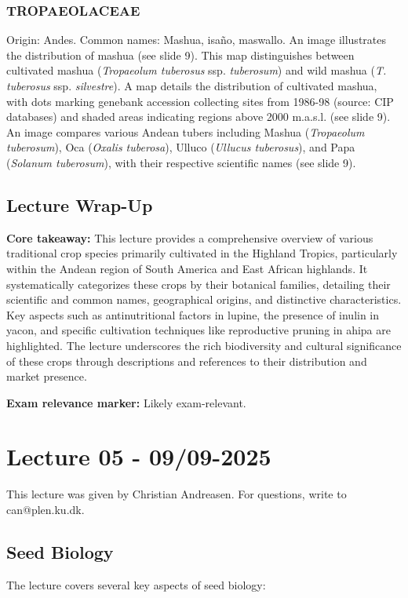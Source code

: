 \subsubsection*{TROPAEOLACEAE} 
Origin: Andes. Common names: Mashua, isaño, maswallo. An image illustrates the distribution of mashua (see slide 9). This map distinguishes between cultivated mashua (\textit{Tropaeolum tuberosus} ssp. \textit{tuberosum}) and wild mashua (\textit{T. tuberosus} ssp. \textit{silvestre}). A map details the distribution of cultivated mashua, with dots marking genebank accession collecting sites from 1986-98 (source: CIP databases) and shaded areas indicating regions above 2000 m.a.s.l. (see slide 9). An image compares various Andean tubers including Mashua (\textit{Tropaeolum tuberosum}), Oca (\textit{Oxalis tuberosa}), Ulluco (\textit{Ullucus tuberosus}), and Papa (\textit{Solanum tuberosum}), with their respective scientific names (see slide 9).


\subsection*{Lecture Wrap-Up} \textbf{Core takeaway:} 
This lecture provides a comprehensive overview of various traditional crop species primarily cultivated in the Highland Tropics, particularly within the Andean region of South America and East African highlands. It systematically categorizes these crops by their botanical families, detailing their scientific and common names, geographical origins, and distinctive characteristics. Key aspects such as antinutritional factors in lupine, the presence of inulin in yacon, and specific cultivation techniques like reproductive pruning in ahipa are highlighted. The lecture underscores the rich biodiversity and cultural significance of these crops through descriptions and references to their distribution and market presence. 

\vspace{1em} \textbf{Exam relevance marker:} Likely exam-relevant.

\section{Lecture 05 - 09/09-2025}
This lecture was given by Christian Andreasen. For questions, write to can@plen.ku.dk.
\subsection{Seed Biology} 
The lecture covers several key aspects of seed biology: 

